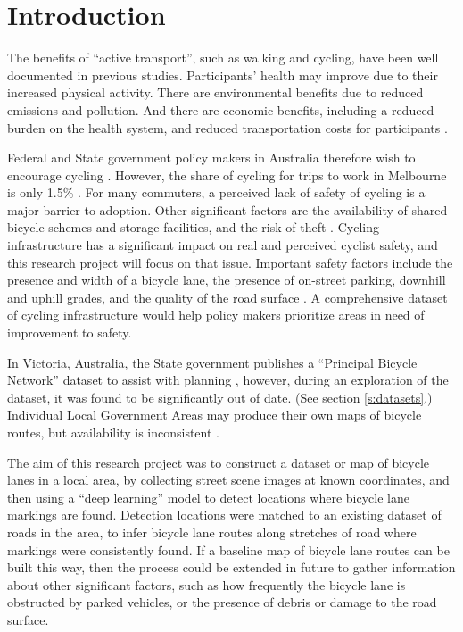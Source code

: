 \documentclass[11pt,twoside]{report}
\begin{document}

\tableofcontents
\listoffigures
\listoftables


\chapter{Introduction}


The benefits of ``active transport'', such as walking and cycling, have been well documented in previous studies.  Participants' health may improve due to their increased physical activity.  There are environmental benefits due to reduced emissions and pollution.  And there are economic benefits, including a reduced burden on the health system, and reduced transportation costs for participants \cite{LEE2012219} \cite{RABL2012121}.

Federal and State government policy makers in Australia therefore wish to encourage cycling \cite{federal_policy_2019} \cite{state_policy_2020}.  However, the share of cycling for trips to work in Melbourne is only 1.5\% \cite{melbactive}.  For many commuters, a perceived lack of safety of cycling is a major barrier to adoption.  Other significant factors are the availability of shared bicycle schemes and storage facilities, and the risk of theft \cite{WILSON2018234}.  Cycling infrastructure has a significant impact on real and perceived cyclist safety, and this research project will focus on that issue.  Important safety factors include the presence and width of a bicycle lane, the presence of on-street parking, downhill and uphill grades, and the quality of the road surface \cite{BIKESAFETY} \cite{Teschke2012}.  A comprehensive dataset of cycling infrastructure would help policy makers  prioritize areas in need of improvement to safety.

In Victoria, Australia, the State government publishes a ``Principal Bicycle Network'' dataset to assist with planning \cite{PrincipalBicycleNetwork}, however, during an exploration of the dataset, it was found to be significantly out of date.   (See section \ref{s:datasets}.)  Individual Local Government Areas may produce their own maps of bicycle routes, but availability is inconsistent \cite{vicroads_maps}.

The aim of this research project was to construct a dataset or map of bicycle lanes in a local area, by collecting street scene images at known coordinates, and then using a ``deep learning'' model to detect locations where bicycle lane markings are found.  Detection locations were matched to an existing dataset of roads in the area, to infer bicycle lane routes along stretches of road where markings were consistently found.  If a baseline map of bicycle lane routes can be built this way, then the process could be extended in future to gather information about other significant factors, such as how frequently the bicycle lane is obstructed by parked vehicles, or the presence of debris or damage to the road surface.
\end{document}
